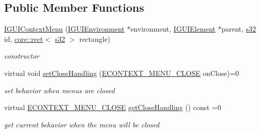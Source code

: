 \subsection*{Public Member Functions}
\begin{DoxyCompactItemize}
\item 
\mbox{\label{classirr_1_1gui_1_1IGUIContextMenu_ab7201b420431830aaaf8f9a0a831c859}} 
\hyperlink{classirr_1_1gui_1_1IGUIContextMenu_ab7201b420431830aaaf8f9a0a831c859}{I\+G\+U\+I\+Context\+Menu} (\hyperlink{classirr_1_1gui_1_1IGUIEnvironment}{I\+G\+U\+I\+Environment} $\ast$environment, \hyperlink{classirr_1_1gui_1_1IGUIElement}{I\+G\+U\+I\+Element} $\ast$parent, \hyperlink{namespaceirr_ac66849b7a6ed16e30ebede579f9b47c6}{s32} id, \hyperlink{classirr_1_1core_1_1rect}{core\+::rect}$<$ \hyperlink{namespaceirr_ac66849b7a6ed16e30ebede579f9b47c6}{s32} $>$ rectangle)
\begin{DoxyCompactList}\small\item\em constructor \end{DoxyCompactList}\item 
\mbox{\label{classirr_1_1gui_1_1IGUIContextMenu_ae58a13dc73dffc7d30a907b76111a36d}} 
virtual void \hyperlink{classirr_1_1gui_1_1IGUIContextMenu_ae58a13dc73dffc7d30a907b76111a36d}{set\+Close\+Handling} (\hyperlink{namespaceirr_1_1gui_a0868ffd1ff3d3fc1e2db2fcd118e320d}{E\+C\+O\+N\+T\+E\+X\+T\+\_\+\+M\+E\+N\+U\+\_\+\+C\+L\+O\+SE} on\+Close)=0
\begin{DoxyCompactList}\small\item\em set behavior when menus are closed \end{DoxyCompactList}\item 
\mbox{\label{classirr_1_1gui_1_1IGUIContextMenu_ac9f46b106a1732ab474f3b38bf564edb}} 
virtual \hyperlink{namespaceirr_1_1gui_a0868ffd1ff3d3fc1e2db2fcd118e320d}{E\+C\+O\+N\+T\+E\+X\+T\+\_\+\+M\+E\+N\+U\+\_\+\+C\+L\+O\+SE} \hyperlink{classirr_1_1gui_1_1IGUIContextMenu_ac9f46b106a1732ab474f3b38bf564edb}{get\+Close\+Handling} () const =0
\begin{DoxyCompactList}\small\item\em get current behavior when the menu will be closed \end{DoxyCompactList}\item 
\mbox{\label{classirr_1_1gui_1_1IGUIContextMenu_a3e65b423c67002b64d6271072b19a829}} 

\end{DoxyCompactItemize}
